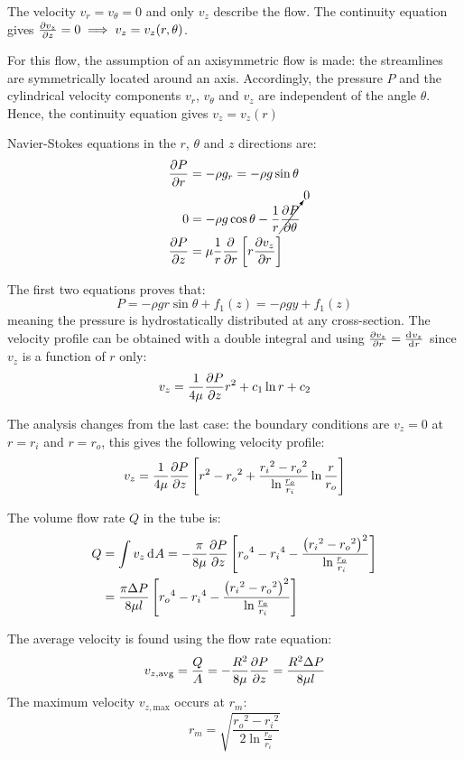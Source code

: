 \documentclass[10pt, twocolumn]{article}
\begin{document}
The velocity \(v_r = v_\theta = 0\) and only \(v_z\) describe the flow.
The continuity equation gives \(\frac{\partial v_z}{\partial z} = 0 \implies v_z = v_z(r,\theta)\).

For this flow, the assumption of an axisymmetric flow is made: the streamlines are symmetrically located around an axis.
Accordingly, the pressure \(P\) and the cylindrical velocity components \(v_r\), \(v_\theta\) and \(v_z\) are independent of the angle \(\theta\).
Hence, the continuity equation gives \(v_z = v_z(r)\)

Navier-Stokes equations in the \(r\), \(\theta\) and \(z\) directions are:
\begin{align*}
  \frac{\partial P}{\partial r} & = -\rho g_r = -\rho g \sin\theta                                                      \\
  0                        & = - \rho g \cos\theta - \frac{1}{r} \cancelto{0}{\frac{\partial P}{\partial \theta}}       \\
  \frac{\partial P}{\partial z} & = \mu \frac{1}{r} \frac{\partial }{\partial r} \left[ r \frac{\partial v_z}{\partial r} \right]
\end{align*}

The first two equations proves that:
\[
  P = -\rho g r \sin\theta + f_1(z) = -\rho g y + f_1(z)
\]
meaning the pressure is hydrostatically distributed at any cross-section.
The velocity profile can be obtained with a double integral and using \(\frac{\partial v_z}{\partial r} = \frac{\mathrm{d}^{} v_z}{\mathrm{d}^{} r}\) since \(v_z\) is a function of \(r\) only:
\[
  v_z = \frac{1}{4\mu} \frac{\partial P}{\partial z} r^2 + c_1 \ln{r} + c_2
\]

The analysis changes from the last case: the boundary conditions are \(v_z = 0\) at \(r = r_i\) and \(r = r_o\), this gives the following velocity profile:
\[
  v_z = \frac{1}{4\mu} \frac{\partial P}{\partial z} \left[ r^2 - {r_o}^2 + \frac{{r_i}^2 - {r_o}^2}{\ln\frac{r_o}{r_i}} \ln\frac{r}{r_o} \right]
\]

The volume flow rate \(Q\) in the tube is:
\begin{align*}
  Q & = \int{v_z \,\mathrm{d}^{} A} = -\frac{\pi}{8\mu} \frac{\partial P}{\partial z} \left[ {r_o}^4 - {r_i}^4 - \frac{\left( {r_i}^2 - {r_o}^2 \right)^2}{\ln\frac{r_o}{r_i}} \right] \\
    & = \frac{\pi\Delta P}{8\mu l} \left[ {r_o}^4 - {r_i}^4 - \frac{\left( {r_i}^2 - {r_o}^2 \right)^2}{\ln\frac{r_o}{r_i}} \right]
\end{align*}

The average velocity is found using the flow rate equation:
\[
  v_{z,\mathrm{avg}} = \frac{Q}{A} = -\frac{R^2 }{8 \mu}\frac{\partial P}{\partial z} = \frac{R^2 \Delta P}{8\mu l}
\]
The maximum velocity \(v_{z,\mathrm{max}}\) occurs at \(r_m\):
\[
  r_m = \sqrt{\frac{{r_o}^2 - {r_i}^2}{2\ln\frac{r_o}{r_i}}}
\]
\end{document}
